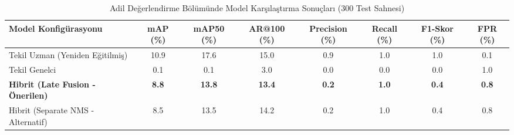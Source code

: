 \begin{table}[htbp]
\caption{Adil Değerlendirme Bölümünde Model Karşılaştırma Sonuçları (300 Test Sahnesi)}
\label{tab:model_comparison}
\centering
\begin{tabular}{lccccccc}
\hline
\textbf{Model Konfigürasyonu} & \textbf{mAP (\%)} & \textbf{mAP50 (\%)} & \textbf{AR@100 (\%)} & \textbf{Precision (\%)} & \textbf{Recall (\%)} & \textbf{F1-Skor (\%)} & \textbf{FPR (\%)} \\ \hline
Tekil Uzman (Yeniden Eğitilmiş) & 10.9 & 17.6 & 15.0 & 0.9 & 1.0 & 1.0 & 0.1 \\
Tekil Genelci & 0.1 & 0.1 & 3.0 & 0.0 & 0.0 & 0.0 & 1.0 \\
\textbf{Hibrit (Late Fusion - Önerilen)} & \textbf{8.8} & \textbf{13.8} & \textbf{13.4} & \textbf{0.2} & \textbf{1.0} & \textbf{0.4} & \textbf{0.8} \\
Hibrit (Separate NMS - Alternatif) & 8.5 & 13.5 & 14.2 & 0.2 & 1.0 & 0.4 & 0.8 \\
\hline
\end{tabular}
\end{table}
